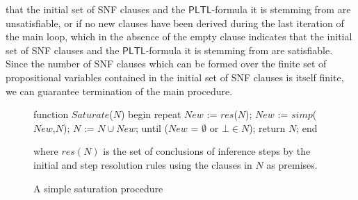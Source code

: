 \documentclass[11pt]{article}
\newcommand{\pltl}{\ml{PLTL}\xspace}
\newcommand{\ml}[1]{\ensuremath{\mathsf{#1}}}
\newcommand{\TRPpp}{\textbf{TRP\protect\raisebox{0.4ex}{\scriptsize{+}{+}}}\xspace}
\begin{document}
that the initial set of SNF clauses and the \pltl-formula it is stemming from
are unsatisfiable, or if no new clauses have been derived during
the last iteration of the main loop, which in the absence of the empty
clause indicates that the initial set
of SNF clauses and the \pltl-formula it is stemming from are
satisfiable. Since the number of SNF clauses which can be formed 
over the finite set of propositional variables contained in the initial
set of SNF clauses is itself finite, we can guarantee termination of
the main procedure.
\begin{figure}[htb]
\InBodyLeftNumberLine
\begin{program}\UnnumLine
function $\mathit{Saturate}$($N$)\UnnumLine
begin\UnnumLine
  repeat\UnnumLine
    $\mathit{New}$ := $\mathit{res}$($N$);\UnnumLine
    $\mathit{New}$ := $\mathit{simp}$($\mathit{New}$,$N$);\UnnumLine
    $N$ := $N\cup\mathit{New}$;\UnnumLine
  until ($\mathit{New}$ = $\emptyset$ or $\bot\in N$);\UnnumLine
  return $N$;\UnnumLine
end
\end{program}
where $\mathit{res}(N)$ is the set of conclusions of inference steps
by the initial and step resolution rules using the clauses in $N$ as
premises.
\caption{A simple saturation procedure\label{prog_sat}}
\end{figure}
\end{document}
